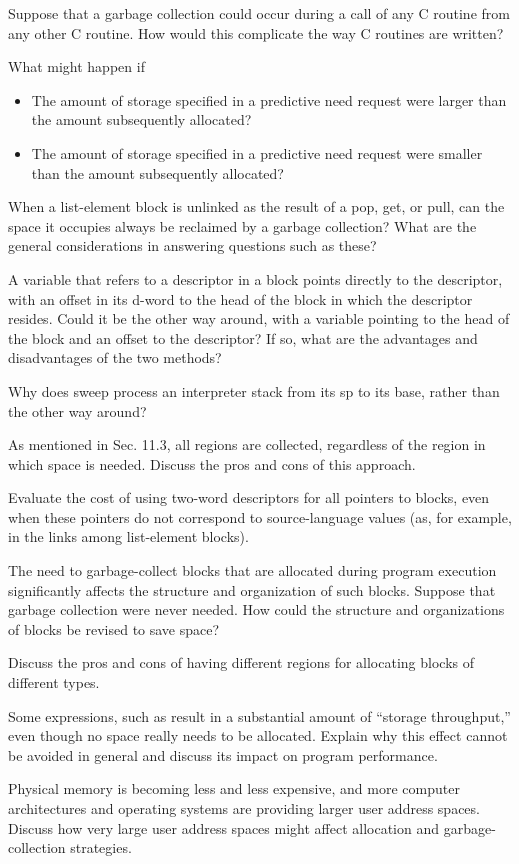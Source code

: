  Suppose that a garbage collection could occur
during a call of any C routine from any other C routine. How would
this complicate the way C routines are written?

 What might happen if

\begin{itemize}

\item The amount of storage specified in a predictive need request
were larger than the amount subsequently allocated?

\item The amount of storage specified in a predictive need request
were smaller than the amount subsequently allocated?

\end{itemize}

 When a list-element block is unlinked as the
result of a pop, get, or pull, can the space it occupies always be
reclaimed by a garbage collection? What are the general considerations
in answering questions such as these?

 A variable that refers to a descriptor in a
block points directly to the descriptor, with an offset in its d-word
to the head of the block in which the descriptor resides. Could it be
the other way around, with a variable pointing to the head of the
block and an offset to the descriptor? If so, what are the advantages
and disadvantages of the two methods?

 Why does sweep process an interpreter stack from
its sp to its base, rather than the other way around?

 As mentioned in Sec. 11.3, all regions are
collected, regardless of the region in which space is needed. Discuss
the pros and cons of this approach.

 Evaluate the cost of using two-word descriptors
for all pointers to blocks, even when these pointers do not correspond
to source-language values (as, for example, in the links among
list-element blocks).

 The need to garbage-collect blocks that are
allocated during program execution significantly affects the structure
and organization of such blocks. Suppose that garbage collection were
never needed. How could the structure and organizations of blocks be
revised to save space?

 Discuss the pros and cons of having different
regions for allocating blocks of different types.

 Some expressions, such as
\noindent result in a substantial amount of ``storage
throughput,'' even though no space really needs to be
allocated. Explain why this effect cannot be avoided in general and
discuss its impact on program performance.

 Physical memory is becoming less and less
expensive, and more computer architectures and operating systems are
providing larger user address spaces. Discuss how very large user
address spaces might affect allocation and garbage-collection
strategies.

